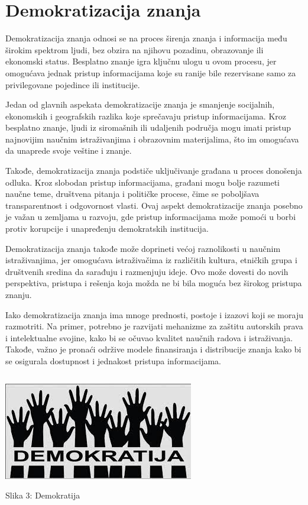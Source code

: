\documentclass[a4paper]{article}
\begin{document}
{\setlength{\parskip}{2em}


\section{Demokratizacija znanja}
\label{Demokratizacija znanja}

Demokratizacija znanja odnosi se na proces širenja znanja i informacija među širokim spektrom ljudi, bez obzira na njihovu pozadinu, obrazovanje ili ekonomski status. Besplatno znanje igra ključnu ulogu u ovom procesu, jer omogućava jednak pristup informacijama koje su ranije bile rezervisane samo za privilegovane pojedince ili institucije.

Jedan od glavnih aspekata demokratizacije znanja je smanjenje socijalnih, ekonomskih i geografskih razlika koje sprečavaju pristup informacijama. Kroz besplatno znanje, ljudi iz siromašnih ili udaljenih područja mogu imati pristup najnovijim naučnim istraživanjima i obrazovnim materijalima, što im omogućava da unaprede svoje veštine i znanje.

Takođe, demokratizacija znanja podstiče uključivanje građana u proces donošenja odluka. Kroz slobodan pristup informacijama, građani mogu bolje razumeti naučne teme, društvena pitanja i političke procese, čime se poboljšava transparentnost i odgovornost vlasti. Ovaj aspekt demokratizacije znanja posebno je važan u zemljama u razvoju, gde pristup informacijama može pomoći u borbi protiv korupcije i unapređenju demokratskih institucija.

Demokratizacija znanja takođe može doprineti većoj raznolikosti u naučnim istraživanjima, jer omogućava istraživačima iz različitih kultura, etničkih grupa i društvenih sredina da sarađuju i razmenjuju ideje. Ovo može dovesti do novih perspektiva, pristupa i rešenja koja možda ne bi bila moguća bez širokog pristupa znanju.

Iako demokratizacija znanja ima mnoge prednosti, postoje i izazovi koji se moraju razmotriti. Na primer, potrebno je razvijati mehanizme za zaštitu autorskih prava i intelektualne svojine, kako bi se očuvao kvalitet naučnih radova i istraživanja. Takođe, važno je pronaći održive modele finansiranja i distribucije znanja kako bi se osigurala dostupnost i jednakost pristupa informacijama.


\begin{verbatim}

\end{verbatim}

\begin{center}
\includegraphics[scale=0.85]{demokratija.jpeg}
\end{center}
\caption{Slika 3: Demokratija}
\label{demokratija}


}
\end{document}
